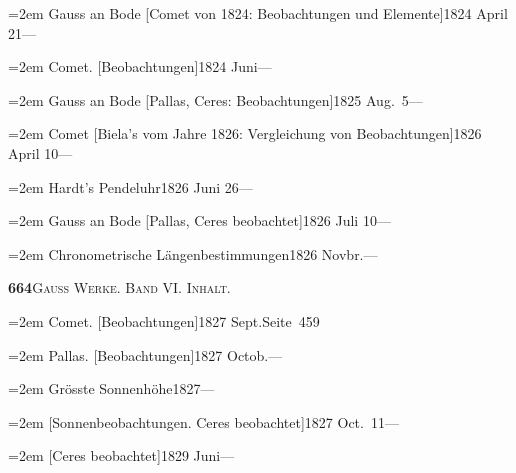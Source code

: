 \documentclass[12pt,a4paper]{article}
\begin{document}
{{{{{{{{{\vspace{0.5mm}
\noindent\hangindent=2em
Gauss an Bode [Comet von 1824: Beobachtungen und Elemente]\hfill 1824 April 21\quad ---

\vspace{0.5mm}
\noindent\hangindent=2em
Comet. [Beobachtungen]\hfill 1824 Juni\quad ---

\vspace{0.5mm}
\noindent\hangindent=2em
Gauss an Bode [Pallas, Ceres: Beobachtungen]\hfill 1825 Aug.\ 5\quad ---

\vspace{0.5mm}
\noindent\hangindent=2em
Comet [Biela's vom Jahre 1826: Vergleichung von Beobachtungen]\hfill 1826 April 10\quad ---

\vspace{0.5mm}
\noindent\hangindent=2em
Hardt's Pendeluhr\hfill 1826 Juni 26\quad ---

\vspace{0.5mm}
\noindent\hangindent=2em
Gauss an Bode [Pallas, Ceres beobachtet]\hfill 1826 Juli 10\quad ---

\vspace{0.5mm}
\noindent\hangindent=2em
Chronometrische L\"angenbestimmungen\hfill 1826 Novbr.\quad ---

\newpage

\begin{center}\small\textbf{664}\quad\textsc{Gauss Werke. Band VI. Inhalt.}\end{center}

\vspace{0.3cm}

{\small
\noindent\hangindent=2em
Comet. [Beobachtungen]\hfill 1827 Sept.\quad Seite\ 459

\vspace{0.5mm}
\noindent\hangindent=2em
Pallas. [Beobachtungen]\hfill 1827 Octob.\quad ---

\vspace{0.5mm}
\noindent\hangindent=2em
Gr\"osste Sonnenh\"ohe\hfill 1827\quad ---

\vspace{0.5mm}
\noindent\hangindent=2em
[Sonnenbeobachtungen. Ceres beobachtet]\hfill 1827 Oct.\ 11\quad ---

\vspace{0.5mm}
\noindent\hangindent=2em
[Ceres beobachtet]\hfill 1829 Juni\quad ---

}}}}}}}}}}
\end{document}
